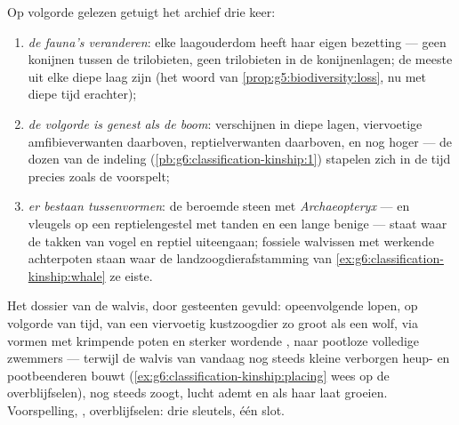 \begin{proposition}\label{prop:g9:evidence-of-evolution:record}
Op volgorde gelezen getuigt het archief drie keer:
\begin{enumerate}
  \item \emph{de fauna's veranderen}: elke laagouderdom heeft
        haar eigen bezetting --- geen konijnen tussen de
        trilobieten, geen trilobieten in de konijnenlagen; de
        meeste  uit elke diepe laag zijn
        \emph{} (het woord van
        \cref{prop:g5:biodiversity:loss}, nu met diepe tijd
        erachter);
  \item \emph{de volgorde is genest als de boom}: 
        verschijnen in diepe lagen, viervoetige amfibieverwanten
        daarboven, reptielverwanten daarboven,  en
         nog hoger --- de dozen van de indeling
        (\cref{pb:g6:classification-kinship:1}) stapelen zich in
        de tijd precies zoals de  voorspelt;
  \item \emph{er bestaan tussenvormen}: de beroemde steen met
        \emph{Archaeopteryx} ---  en vleugels op een
        reptielengestel met tanden en een lange benige  ---
        staat waar de takken van vogel en reptiel uiteengaan;
        fossiele walvissen met werkende achterpoten staan waar de
        landzoogdierafstamming van
        \cref{ex:g6:classification-kinship:whale} ze eiste.
\end{enumerate}
\end{proposition}
\admitted

\begin{example}[De walvisreeks]\label{ex:g9:evidence-of-evolution:whales}
Het dossier van de walvis, door gesteenten gevuld:
opeenvolgende  lopen, op volgorde van tijd, van een
viervoetig kustzoogdier zo groot als een wolf, via vormen met
krimpende poten en sterker wordende , naar pootloze
volledige zwemmers --- terwijl de walvis van vandaag nog steeds
kleine verborgen heup- en pootbeenderen bouwt
(\cref{ex:g6:classification-kinship:placing} wees op de
overblijfselen), nog steeds zoogt, lucht ademt en als  haar
laat groeien. Voorspelling, , overblijfselen: drie
sleutels, één slot.
\end{example}

